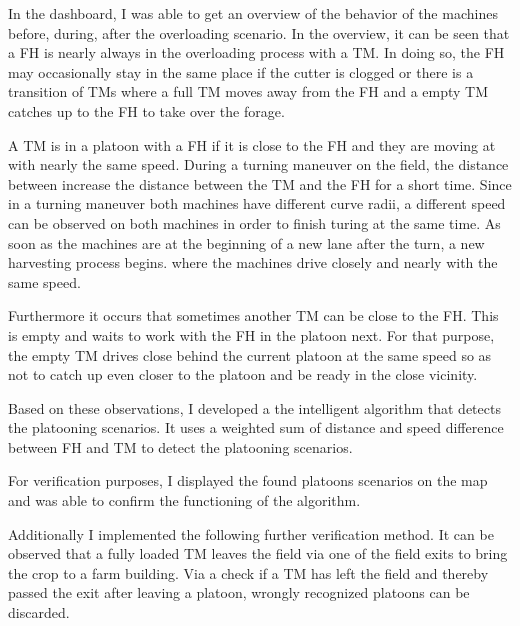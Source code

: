 \documentclass[]{nsm-thesis}
\begin{document}
In the dashboard, I was able to get an overview of the behavior of the machines before, during, after the overloading scenario.
In the overview, it can be seen that a \ac{FH} is nearly always in the overloading process with a \ac{TM}. In doing so, the FH may occasionally stay in the same place if the cutter is clogged or there is a transition of \ac{TM}s where a full \ac{TM} moves away from the \ac{FH} and a empty \ac{TM} catches up to the \ac{FH} to take over the forage.

A \ac{TM} is in a platoon with a \ac{FH} if it is close to the \ac{FH} and they are moving at
with nearly the same speed. During a turning maneuver on the field, the distance between
increase the distance between the \ac{TM} and the \ac{FH} for a short time. Since in a turning maneuver both machines have different curve radii, a different speed can be observed on both machines in order to finish turing at the same time.
As soon as the machines are at the beginning of a new lane after the turn, a new harvesting process begins.
where the machines drive closely and nearly with the same speed. 

Furthermore it occurs that sometimes another TM can be close to the \ac{FH}. This is empty and waits to work with the FH in the platoon next. For that purpose, the empty TM drives close behind the current platoon at the same speed so as not to catch up even closer to the platoon and be ready in the close vicinity.

Based on these observations, I developed a the intelligent algorithm that detects the platooning scenarios. It uses a weighted sum of distance and speed difference between \ac{FH} and \ac{TM} to detect the platooning scenarios.

For verification purposes, I displayed the found platoons scenarios on the map and was able to confirm the functioning of the algorithm. 

Additionally I implemented the following further verification method. 
It can be observed  that a fully loaded TM leaves the field via one of the field exits to bring the crop to a farm building. Via a
check if a TM has left the field and thereby passed the exit after leaving a platoon,
wrongly recognized platoons can be discarded.
\end{document}
